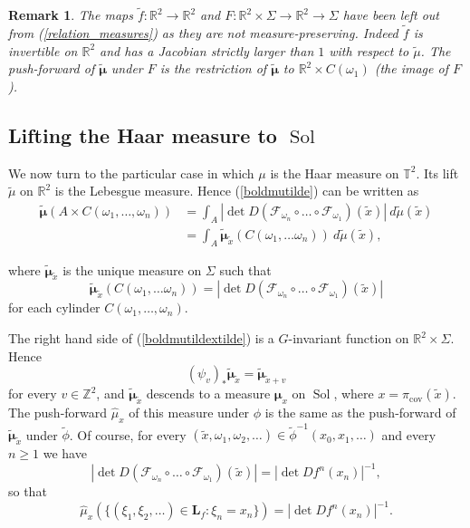 \documentclass[11pt,letterpaper,reqno]{article}
\newtheorem{remark}{Remark}[section]
\newcommand{\TT}{\mathbb{T}^2}
\newcommand{\RR}{\mathbb{R}^2}
\newcommand{\ZZ}{\mathbb{Z}^2}
\newcommand{\hTTf}[1][f]{\mathbf{L}_{#1}}
\newcommand{\cF}{\mathcal{F}}
\newcommand{\tf}{\tilde{f}}
\newcommand{\tx}{\tilde{x}}
\newcommand{\tmu}{\tilde{\mu}}
\newcommand{\bmu}{\boldsymbol{\mu}}
\newcommand{\tbmu}{\tilde{\bmu}}
\newcommand{\hmu}{\hat{\mu}}
\newcommand{\pcov}{\pi_{\mathrm{cov}}}
\newcommand{\Sol}{\operatorname{Sol}}
\begin{document}
\begin{remark}\label{not_invariant}
The maps $\tf: \RR \to \RR$ and $F: \RR \times \Sigma \to \RR \to \Sigma$ have been left out from (\ref{relation_measures}) as they are not measure-preserving. Indeed $\tf$ is invertible on $\RR$ and has a Jacobian strictly larger than $1$ with respect to $\tmu$. The push-forward of $\tbmu$ under $F$ is the restriction of $\tbmu$ to $\RR \times C(\omega_1)$ (the image of $F$).
\end{remark}

\subsection{Lifting the Haar measure to \texorpdfstring{$\Sol$}{Sol}}

We now turn to the particular case in which $\mu$ is the Haar measure on $\TT$. Its lift $\tmu$ on $\RR$ is the Lebesgue measure. Hence (\ref{boldmutilde}) can be written as
\begin{align}\label{tbmu}
\tilde{\bmu}(A\times C(\omega_1, \dots, \omega_n)) & = \int_{A} | \det D (\cF_{\omega_n} \circ \ldots \circ \cF_{\omega_1})(\tx)| \ d\tmu(\tx) \\
& = \int_A \tilde{\bmu}_{\tx} (C(\omega_1, \ldots \omega_n)) \ d\tmu(\tx),
\end{align}

where $\tilde{\bmu}_{\tx}$ is the unique measure on $\Sigma$ such that 
\begin{equation} \label{boldmutildextilde}
\tilde{\bmu}_{\tx} (C(\omega_1, \ldots \omega_n)) = | \det D (\cF_{\omega_n} \circ \ldots \circ \cF_{\omega_1})(\tx) |
\end{equation}
 for each cylinder $C(\omega_1, \ldots, \omega_n)$. 
 
The right hand side of (\ref{boldmutildextilde}) is a $G$-invariant function on $\RR \times \Sigma$. Hence 
\[(\psi_v)_* \tilde{\bmu}_{\tx} = \tilde{\bmu}_{\tx  + v}\]
for every $v \in \ZZ$, and $\tilde{\bmu}_{\tx}$ descends to a measure $\bmu_{x}$ on $\Sol$, where $x = \pcov(\tx)$. The push-forward $\hmu_x$ of this measure under $\phi$ is the same as the push-forward of $\tilde{\bmu}_{\tx}$ under $\tilde{\phi}$. Of course, for every $(\tx, \omega_1, \omega_2, \ldots) \in \tilde{\phi}^{-1}(x_0, x_1, \ldots)$ and every $n \geq 1$ we have
\[|\det D (\cF_{\omega_n} \circ \ldots \circ \cF_{\omega_1})(\tx)| = |\det D f^n(x_n)|^{-1},\]
so that 
\begin{equation} \label{mux}
\hmu_x(\{ (\xi_1, \xi_2, \ldots) \in \hTTf : \xi_n = x_n \}) = |\det Df^n(x_n)|^{-1}.
\end{equation}
\end{document}
